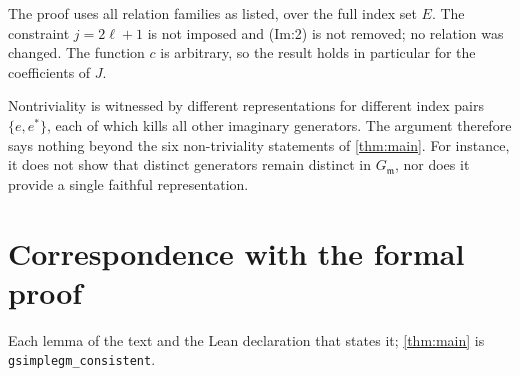 \documentclass[11pt]{article}
\theoremstyle{definition}
\theoremstyle{remark}
\begin{document}
The proof uses all relation families as listed, over the full index set $E$. The constraint $j=2\ell+1$ is not imposed and (Im:2) is not removed; no relation was changed. The function $c$ is arbitrary, so the result holds in particular for the coefficients of $J$.

Nontriviality is witnessed by different representations for different index pairs $\{e,e^\ast\}$, each of which kills all other imaginary generators. The argument therefore says nothing beyond the six non-triviality statements of \cref{thm:main}. For instance, it does not show that distinct generators remain distinct in $G_{\mathfrak m}$, nor does it provide a single faithful representation.

\appendix
\section{Correspondence with the formal proof}
Each lemma of the text and the Lean declaration that states it; \cref{thm:main} is \texttt{gsimplegm\_consistent}.
\end{document}
